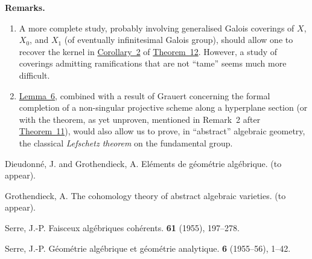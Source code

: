 \documentclass{article}
\newenvironment{rmenv}[1]
  {\phantomsection\par\medskip\noindent\textbf{#1.}\rmfamily}
  {\medskip}
\begin{document}
\begin{rmenv}{Remarks}
  \begin{enumerate}[1)]
    \item A more complete study, probably involving generalised Galois coverings of $X$, $X_0$, and $X_1$ (of eventually infinitesimal Galois group), should allow one to recover the kernel in \hyperref[theorem12corollary2]{Corollary~2} of \hyperref[theorem12]{Theorem~12}.
      However, a study of coverings admitting ramifications that are not ``tame'' seems much more difficult.
    \item \hyperref[lemma6]{Lemma~6}, combined with a result of Grauert concerning the formal completion of a non-singular projective scheme along a hyperplane section (or with the theorem, as yet unproven, mentioned in Remark~2 after \hyperref[theorem11]{Theorem~11}), would also allow us to prove, in ``abstract'' algebraic geometry, the classical \emph{Lefschetz theorem} on the fundamental group.
  \end{enumerate}
\end{rmenv}



\nocite{*}
\begin{thebibliography}{4}

  {Dieudonn\'{e}, J. and Grothendieck, A.}
  \newblock El\'{e}ments de g\'{e}om\'{e}trie alg\'{e}brique.
   (to appear).

  {Grothendieck, A.}
  \newblock The cohomology theory of abstract algebraic varieties.
   (to appear).

  {Serre, J.-P.}
  \newblock Faisceux alg\'{e}briques coh\'{e}rents.
   {\bf 61} (1955), 197--278.

  {Serre, J.-P.}
  \newblock G\'{e}om\'{e}trie alg\'{e}brique et g\'{e}om\'{e}trie analytique.
   \textbf{6} (1955--56), 1--42.

\end{thebibliography}
\end{document}

